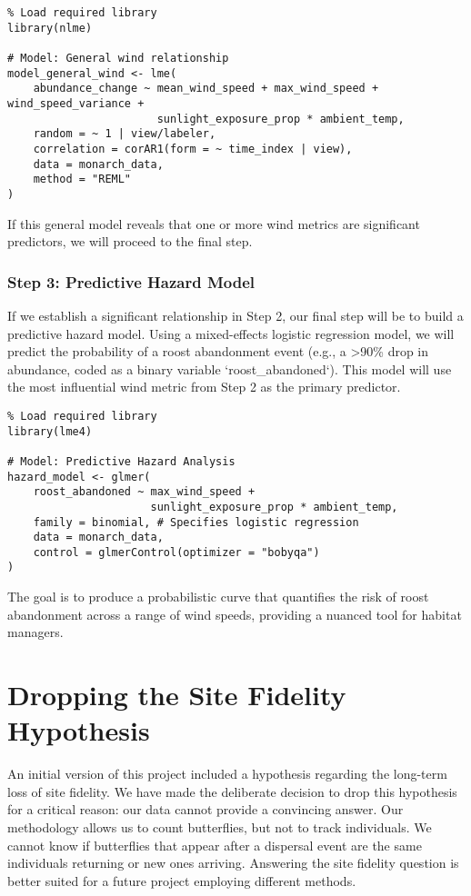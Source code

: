 \begin{verbatim}
% Load required library
library(nlme)

# Model: General wind relationship
model_general_wind <- lme(
    abundance_change ~ mean_wind_speed + max_wind_speed + wind_speed_variance +
                       sunlight_exposure_prop * ambient_temp,
    random = ~ 1 | view/labeler,
    correlation = corAR1(form = ~ time_index | view),
    data = monarch_data,
    method = "REML"
)
\end{verbatim}

If this general model reveals that one or more wind metrics are significant predictors, we will proceed to the final step.

\subsubsection{Step 3: Predictive Hazard Model}

If we establish a significant relationship in Step 2, our final step will be to build a predictive hazard model. Using a mixed-effects logistic regression model, we will predict the probability of a roost abandonment event (e.g., a >90\% drop in abundance, coded as a binary variable `roost_abandoned`). This model will use the most influential wind metric from Step 2 as the primary predictor.

\begin{verbatim}
% Load required library
library(lme4)

# Model: Predictive Hazard Analysis
hazard_model <- glmer(
    roost_abandoned ~ max_wind_speed + 
                      sunlight_exposure_prop * ambient_temp,
    family = binomial, # Specifies logistic regression
    data = monarch_data,
    control = glmerControl(optimizer = "bobyqa")
)
\end{verbatim}

The goal is to produce a probabilistic curve that quantifies the risk of roost abandonment across a range of wind speeds, providing a nuanced tool for habitat managers.

\section{Dropping the Site Fidelity Hypothesis}

An initial version of this project included a hypothesis regarding the long-term loss of site fidelity. We have made the deliberate decision to drop this hypothesis for a critical reason: our data cannot provide a convincing answer. Our methodology allows us to count butterflies, but not to track individuals. We cannot know if butterflies that appear after a dispersal event are the same individuals returning or new ones arriving. Answering the site fidelity question is better suited for a future project employing different methods.

